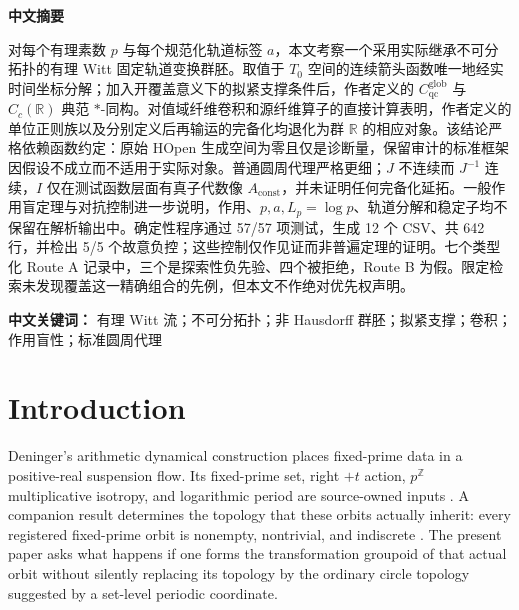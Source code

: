 \documentclass[11pt]{article}
\theoremstyle{definition}
\newcommand{\R}{\mathbb R}
\newcommand{\Z}{\mathbb Z}
\newcommand{\Cglob}{C_{\mathrm{qc}}^{\mathrm{glob}}}
\newcommand{\Aconst}{A_{\mathrm{const}}}
\begin{document}
\begin{center}
\textbf{中文摘要}
\end{center}
对每个有理素数 $p$ 与每个规范化轨道标签 $a$，本文考察一个采用实际继承不可分拓扑的有理 Witt 固定轨道变换群胚。取值于 $T_0$ 空间的连续箭头函数唯一地经实时间坐标分解；加入开覆盖意义下的拟紧支撑条件后，作者定义的 $\Cglob$ 与 $C_c(\R)$ 典范 $*$-同构。对值域纤维卷积和源纤维算子的直接计算表明，作者定义的单位正则族以及分别定义后再输运的完备化均退化为群 $\R$ 的相应对象。该结论严格依赖函数约定：原始 HOpen 生成空间为零且仅是诊断量，保留审计的标准框架因假设不成立而不适用于实际对象。普通圆周代理严格更细；$J$ 不连续而 $J^{-1}$ 连续，$I$ 仅在测试函数层面有真子代数像 $\Aconst$，并未证明任何完备化延拓。一般作用盲定理与对抗控制进一步说明，作用、$p,a,L_p=\log p$、轨道分解和稳定子均不保留在解析输出中。确定性程序通过 57/57 项测试，生成 12 个 CSV、共 642 行，并检出 5/5 个故意负控；这些控制仅作见证而非普遍定理的证明。七个类型化 Route A 记录中，三个是探索性负先验、四个被拒绝，Route B 为假。限定检索未发现覆盖这一精确组合的先例，但本文不作绝对优先权声明。

\medskip
\noindent\textbf{中文关键词：} 有理 Witt 流；不可分拓扑；非 Hausdorff 群胚；拟紧支撑；卷积；作用盲性；标准圆周代理

\tableofcontents

\section{Introduction}
\label{sec:introduction}

Deninger's arithmetic dynamical construction places fixed-prime data in a
positive-real suspension flow.  Its fixed-prime set, right $+t$ action,
$p^{\Z}$ multiplicative isotropy, and logarithmic period are source-owned
inputs \cite[arXiv v4, physical pp.~32--33, Eqs.~(35), (38)--(39); physical
pp.~38--39, Section~6 and Theorem~6.1]{Deninger2026}.  A companion result
determines the topology that these orbits actually inherit: every registered
fixed-prime orbit is nonempty, nontrivial, and indiscrete
\cite[Corollary~5.3, p.~11]{Wang2026Packets}.  The present
paper asks what happens if one forms the transformation groupoid of that
actual orbit without silently replacing its topology by the ordinary circle
topology suggested by a set-level periodic coordinate.
\end{document}
